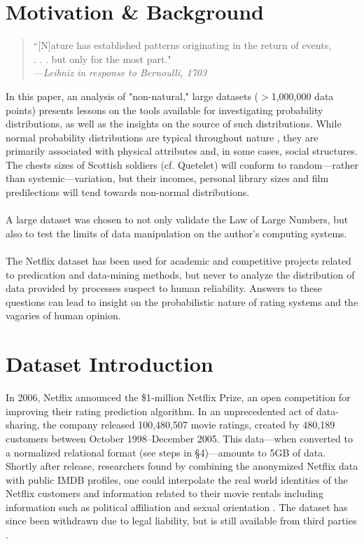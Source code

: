 \documentclass[prodmode,acmtecs]{acmsmall}
\begin{document}
\section{Motivation \& Background}
\medskip
\begin{quote}
``[N]ature has established patterns originating in the return of events,\\
 . . . but only for the most part."\\

\hspace{5em}---\textit{Leibniz in response to Bernoulli, 1703}
\end{quote}
In this paper, an analysis of "non-natural," large datasets ($>$1,000,000 data points) presents lessons on the tools available for investigating probability distributions, as well as the insights on the source of such distributions. While normal probability distributions are typical throughout nature \cite{bernstein:against}, they are primarily associated with physical attributes and, in some cases, social structures. The chests sizes of Scottish soldiers (cf. Quetelet) will conform to random---rather than systemic---variation, but their incomes, personal library sizes and film predilections will tend towards non-normal distributions.
\\
\\
A large dataset was chosen to not only validate the Law of Large Numbers, but also to test the limits of data manipulation on the author's computing systems.
\\
\\
The Netflix dataset has been used for academic and competitive projects related to predication and data-mining methods, but never to analyze the distribution of data provided by processes suspect to human reliability. Answers to these questions can lead to insight on the probabilistic nature of rating systems and the vagaries of human opinion.

\section{Dataset Introduction}

In 2006, Netflix announced the \$1-million Netflix Prize, an open competition for improving their rating prediction algorithm. In an unprecedented act of data-sharing, the company released 100,480,507 movie ratings, created by 480,189 customers between  October 1998--December 2005. This data---when converted to a normalized relational format (see steps in \S4)---amounts to 5GB of data. Shortly after release, researchers found by combining the anonymized Netflix data with public IMDB profiles, one could interpolate the real world identities of the Netflix customers and information related to their movie rentals \cite{DBLP:journals/corr/abs-cs-0610105} including information such as political affiliation and sexual orientation \cite{Wired-01}. The dataset has since been withdrawn due to legal liability, but is still available from third parties \cite{netflix-01}.
\end{document}
